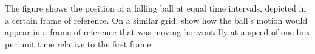 The figure shows the position of a falling ball at equal time intervals,
        depicted in a certain frame of reference.
        On a similar grid, show how the ball's motion would appear in a frame of
        reference that was moving horizontally at a speed of one box per
        unit time relative to the first frame.
